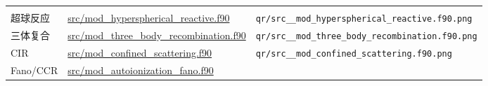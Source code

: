 \documentclass[
]{ctexbook}
\begin{document}
\begin{longtable}[]{@{}lll@{}}
\begin{minipage}[t]{0.30\columnwidth}
\end{minipage}\tabularnewline
\begin{minipage}[t]{0.30\columnwidth}\raggedright
超球反应\strut
\end{minipage} & \begin{minipage}[t]{0.30\columnwidth}\raggedright
\href{https://github.com/l1Ha/QuantumGeneralModule/blob/main/src/mod_hyperspherical_reactive.f90}{src/mod\_hyperspherical\_reactive.f90}\strut
\end{minipage} & \begin{minipage}[t]{0.30\columnwidth}\raggedright
\texttt{qr/src\_\_mod\_hyperspherical\_reactive.f90.png}\strut
\end{minipage}\tabularnewline
\begin{minipage}[t]{0.30\columnwidth}\raggedright
三体复合\strut
\end{minipage} & \begin{minipage}[t]{0.30\columnwidth}\raggedright
\href{https://github.com/l1Ha/QuantumGeneralModule/blob/main/src/mod_three_body_recombination.f90}{src/mod\_three\_body\_recombination.f90}\strut
\end{minipage} & \begin{minipage}[t]{0.30\columnwidth}\raggedright
\texttt{qr/src\_\_mod\_three\_body\_recombination.f90.png}\strut
\end{minipage}\tabularnewline
\begin{minipage}[t]{0.30\columnwidth}\raggedright
CIR\strut
\end{minipage} & \begin{minipage}[t]{0.30\columnwidth}\raggedright
\href{https://github.com/l1Ha/QuantumGeneralModule/blob/main/src/mod_confined_scattering.f90}{src/mod\_confined\_scattering.f90}\strut
\end{minipage} & \begin{minipage}[t]{0.30\columnwidth}\raggedright
\texttt{qr/src\_\_mod\_confined\_scattering.f90.png}\strut
\end{minipage}\tabularnewline
\begin{minipage}[t]{0.30\columnwidth}\raggedright
Fano/CCR\strut
\end{minipage} & \begin{minipage}[t]{0.30\columnwidth}\raggedright
\href{https://github.com/l1Ha/QuantumGeneralModule/blob/main/src/mod_autoionization_fano.f90}{src/mod\_autoionization\_fano.f90}\strut
\end{minipage} & \begin{minipage}[t]{0.30\columnwidth}\raggedright

\end{minipage}
\end{longtable}
\end{document}
